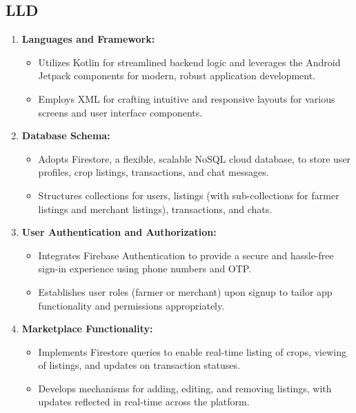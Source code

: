 \documentclass{article}
\begin{document}
\subsection{LLD}
\begin{enumerate}
    \item \textbf{Languages and Framework:}
    \begin{itemize}
        \item Utilizes Kotlin for streamlined backend logic and leverages the Android Jetpack components for modern, robust application development.
        \item Employs XML for crafting intuitive and responsive layouts for various screens and user interface components.
    \end{itemize}
    
    \item \textbf{Database Schema:}
    \begin{itemize}
        \item Adopts Firestore, a flexible, scalable NoSQL cloud database, to store user profiles, crop listings, transactions, and chat messages.
        \item Structures collections for users, listings (with sub-collections for farmer listings and merchant listings), transactions, and chats.
    \end{itemize}
    
    \item \textbf{User Authentication and Authorization:}
    \begin{itemize}
        \item Integrates Firebase Authentication to provide a secure and hassle-free sign-in experience using phone numbers and OTP.
        \item Establishes user roles (farmer or merchant) upon signup to tailor app functionality and permissions appropriately.
    \end{itemize}
    
    \item \textbf{Marketplace Functionality:}
    \begin{itemize}
        \item Implements Firestore queries to enable real-time listing of crops, viewing of listings, and updates on transaction statuses.
        \item Develops mechanisms for adding, editing, and removing listings, with updates reflected in real-time across the platform.
    \end{itemize}
    

\end{enumerate}
\end{document}
